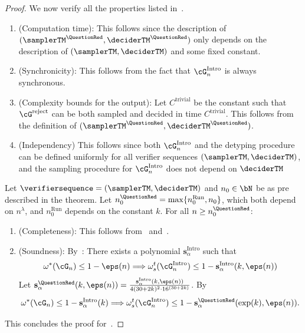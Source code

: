 \begin{proof}
	We now verify all the properties listed in~.
		\begin{enumerate}
		\item (Computation time): This follows since the description of $(\samplerTM^{\QuestionRed}, \deciderTM^{\QuestionRed})$ only depends on the description of $(\samplerTM, \deciderTM)$ and some fixed constant. 
		\item (Synchronicity): This follows from the fact that $\cG^{\text{Intro}}_n$ is always synchronous. 
		\item (Complexity bounds for the output): Let $C^{\text{trivial}}$ be the constant such that $\cG^{\text{reject}}$ can be both sampled and decided in time $C^{\text{trivial}}$. This follows from the definition of $(\samplerTM^{\QuestionRed}, \deciderTM^{\QuestionRed})$. 
	\item (Independency) This follows since both  $\cG_{n}^{\text{Intro}}$ and the detyping procedure can be defined uniformly for all verifier sequences $(\samplerTM, \deciderTM)$, and the sampling procedure for $\cG_{n}^{\text{Intro}}$ does not depend on $\deciderTM$
\end{enumerate}
Let $\verifiersequence = (\samplerTM, \deciderTM)$ and $n_0 \in \bN$ be as pre described in the theorem. Let $n_0^{\QuestionRed} = \max\{ n_0^{\text{Run}}, n_0\}$, which both depend on $n^{\lambda}$, and $n_0^{\text{Run}}$ depends on the constant $k$. For all $n \geq n_0^{\QuestionRed}$:
\begin{enumerate}
\item (Completeness): This follows from~ and~. 
\item (Soundness): By~: There exists a polynomial $\mathbf{s}^{\text{Intro}}_{\alpha}$ such that 
\begin{equation*}
	\omega^*(\cG_n) \leq  1- \eps(n) \Longrightarrow \omega^{t}_s(\cG_n^{\text{Intro}}) \leq 1- \mathbf{s}^{\text{Intro}}_{\alpha}(k,  \eps(n))
\end{equation*}
Let $\mathbf{s}^{\QuestionRed}_{\alpha}(k,  \eps(n)) = \frac{\mathbf{s}^{\text{Intro}}_{\alpha}(k,  \eps(n))}{4(30+2k)^2 \cdot 16^{(30+2k)}}$. By~
\begin{equation*}
	\omega^*(\cG_n) \leq  1- \mathbf{s}^{\text{Intro}}_{\alpha}(k) \Longrightarrow \omega^{t}_s(\cG_n^{\text{Intro}}) \leq  1- \mathbf{s}^{\QuestionRed}_{\alpha}(\exp(k),  \eps(n)).
\end{equation*}
\end{enumerate}
This concludes the proof for~.
\end{proof}


